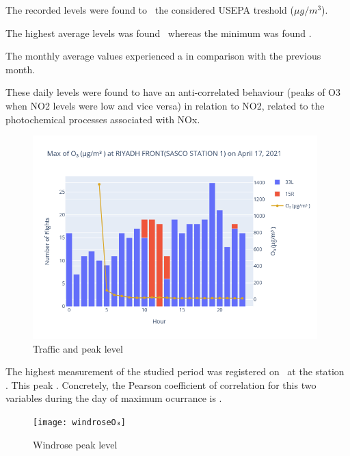 \documentclass[12pt, oneside]{book}
\begin{document}
The recorded  levels were found to \tresholdOthree\ the considered USEPA treshold (\limitOthree $\mu g/m^3$).

The highest average  levels was found \maxDailyOthree\ whereas the minimum was found \minDailyOthree.


The monthly average values experienced a \monthChangeOthree in comparison with the previous month.

These daily levels were found to have an anti-correlated behaviour (peaks of O3 when NO2 levels were low and vice versa) in relation to NO2, related to the photochemical processes associated with NOx.

{\begin{figure}[H]
\centering
\includegraphics[width=0.98\textwidth, keepaspectratio]{image12}
\caption{Traffic and  peak level}\label{image12}
\end{figure}}{}


The highest measurement of the studied period was registered  on \dayMaxOthree \ at the station \stationMaxOthree . This peak \relTrafficMaxOthree . Concretely, the Pearson coefficient of correlation for this two variables during the day of maximum ocurrance is \correlOthree .  

{\begin{figure}[H]
\centering
\texttt{[image: windroseO₃]}
\caption{Windrose  peak level}\label{windroseO3}
\end{figure}}{}
\end{document}

